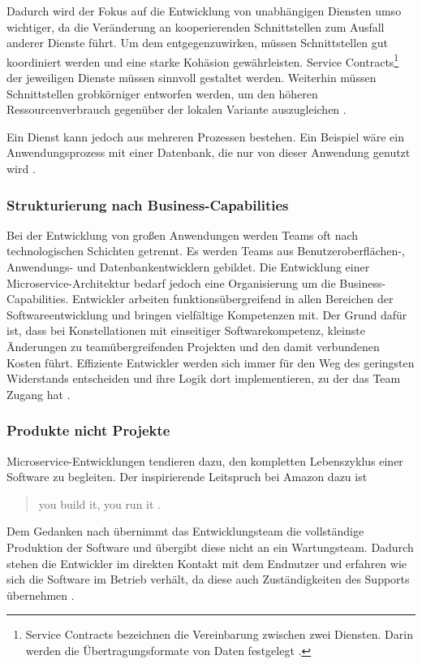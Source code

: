 Dadurch wird der Fokus auf die Entwicklung von unabhängigen Diensten umso wichtiger, da die Veränderung an kooperierenden Schnittstellen zum Ausfall anderer Dienste führt. 
Um dem entgegenzuwirken, müssen Schnittstellen gut koordiniert werden und eine starke Kohäsion gewährleisten. Service Contracts\footnote{Service Contracts bezeichnen die Vereinbarung zwischen zwei Diensten. Darin werden die Übertragungsformate von Daten festgelegt \cite{microservicesvssoa}.} der jeweiligen Dienste müssen sinnvoll gestaltet werden. 
Weiterhin müssen Schnittstellen grobkörniger entworfen werden, um den höheren Ressourcenverbrauch gegenüber der lokalen Variante auszugleichen \cite{FowlerMicroservice, BuildingMicroservicesNewman}. 

Ein Dienst kann jedoch aus mehreren Prozessen bestehen. Ein Beispiel wäre ein Anwendungsprozess mit einer Datenbank, die nur von dieser Anwendung genutzt wird \cite{FowlerMicroservice, BuildingMicroservicesNewman}.

\subsubsection{Strukturierung nach Business-Capabilities}
Bei der Entwicklung von großen Anwendungen werden Teams oft nach technologischen Schichten getrennt. 
Es werden Teams aus Benutzeroberflächen-, Anwendungs- und Datenbankentwicklern gebildet. 
Die Entwicklung einer Microservice-Architektur bedarf jedoch eine Organisierung um die Business-Capabilities. 
Entwickler arbeiten funktionsübergreifend in allen Bereichen der Softwareentwicklung und bringen vielfältige Kompetenzen mit.
Der Grund dafür ist, dass bei Konstellationen mit einseitiger Softwarekompetenz, kleinste Änderungen zu teamübergreifenden Projekten und den damit verbundenen Kosten führt.
Effiziente Entwickler werden sich immer für den Weg des geringsten Widerstands entscheiden und ihre Logik dort implementieren, zu der das Team Zugang hat \cite{FowlerMicroservice}.

\subsubsection{Produkte nicht Projekte}
Microservice-Entwicklungen tendieren dazu, den kompletten Lebenszyklus einer Software zu begleiten. 
Der inspirierende Leitspruch bei Amazon dazu ist \begin{quote}
  \glqq  you build it, you run it \grqq{} \cite{amazon}.\end{quote} 
Dem Gedanken nach übernimmt das Entwicklungsteam die vollständige Produktion der Software und übergibt diese nicht an ein Wartungsteam. 
Dadurch stehen die Entwickler im direkten Kontakt mit dem Endnutzer und erfahren wie sich die Software im Betrieb verhält, da diese auch Zuständigkeiten des Supports übernehmen \cite{FowlerMicroservice}.

